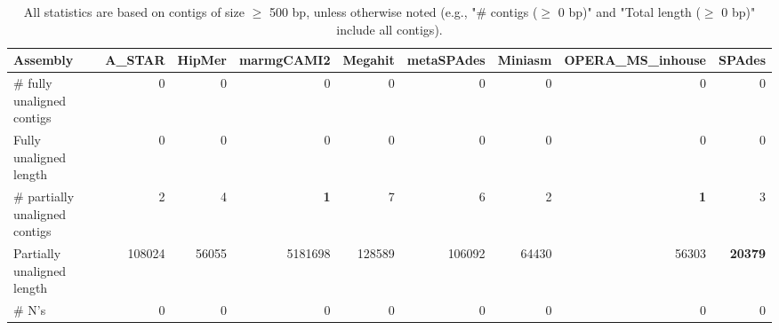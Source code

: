 \documentclass[12pt,a4paper]{article}
\begin{document}
\begin{table}[ht]
\begin{center}
\caption{All statistics are based on contigs of size $\geq$ 500 bp, unless otherwise noted (e.g., "\# contigs ($\geq$ 0 bp)" and "Total length ($\geq$ 0 bp)" include all contigs).}
\begin{tabular}{|l*{8}{|r}|}
\hline
Assembly & A\_STAR & HipMer & marmgCAMI2 & Megahit & metaSPAdes & Miniasm & OPERA\_MS\_inhouse & SPAdes \\ \hline
\# fully unaligned contigs & 0 & 0 & 0 & 0 & 0 & 0 & 0 & 0 \\ \hline
Fully unaligned length & 0 & 0 & 0 & 0 & 0 & 0 & 0 & 0 \\ \hline
\# partially unaligned contigs & 2 & 4 & {\bf 1} & 7 & 6 & 2 & {\bf 1} & 3 \\ \hline
Partially unaligned length & 108024 & 56055 & 5181698 & 128589 & 106092 & 64430 & 56303 & {\bf 20379} \\ \hline
\# N's & 0 & 0 & 0 & 0 & 0 & 0 & 0 & 0 \\ \hline
\end{tabular}
\end{center}
\end{table}
\end{document}
